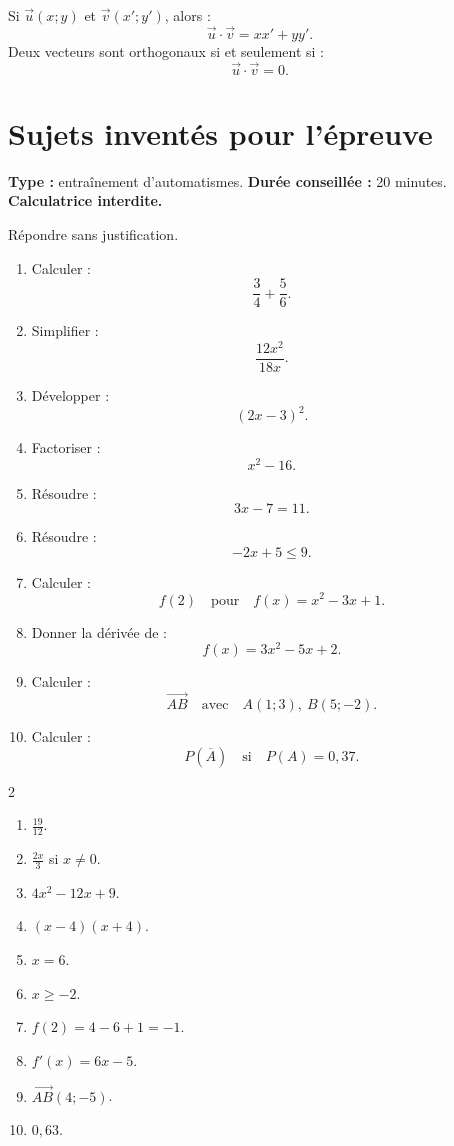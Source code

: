 \documentclass[11pt,a4paper]{article}
\begin{document}
\begin{methode}
Si $\vec u(x;y)$ et $\vec v(x';y')$, alors :
\[
\vec u\cdot \vec v=xx'+yy'.
\]
Deux vecteurs sont orthogonaux si et seulement si :
\[
\vec u\cdot \vec v=0.
\]
\end{methode}

\section{Sujets inventés pour l'épreuve}

\hypertarget{P-AUTO-01}{}
\begin{sujettype}
\textbf{Type :} entraînement d'automatismes.  
\textbf{Durée conseillée :} 20 minutes.  
\textbf{Calculatrice interdite.}

Répondre sans justification.

\begin{enumerate}
  \item Calculer :
  \[
  \frac{3}{4}+\frac{5}{6}.
  \]
  \item Simplifier :
  \[
  \frac{12x^2}{18x}.
  \]
  \item Développer :
  \[
  (2x-3)^2.
  \]
  \item Factoriser :
  \[
  x^2-16.
  \]
  \item Résoudre :
  \[
  3x-7=11.
  \]
  \item Résoudre :
  \[
  -2x+5\leq 9.
  \]
  \item Calculer :
  \[
  f(2)\quad\text{pour}\quad f(x)=x^2-3x+1.
  \]
  \item Donner la dérivée de :
  \[
  f(x)=3x^2-5x+2.
  \]
  \item Calculer :
  \[
  \overrightarrow{AB}
  \quad\text{avec}\quad
  A(1;3),\ B(5;-2).
  \]
  \item Calculer :
  \[
  P(\overline A)
  \quad\text{si}\quad
  P(A)=0{,}37.
  \]
\end{enumerate}
\end{sujettype}

\begin{corrige}[P-AUTO-01]
\begin{multicols}{2}
\begin{enumerate}
  \item $\frac{19}{12}$.
  \item $\frac{2x}{3}$ si $x\neq0$.
  \item $4x^2-12x+9$.
  \item $(x-4)(x+4)$.
  \item $x=6$.
  \item $x\geq -2$.
  \item $f(2)=4-6+1=-1$.
  \item $f'(x)=6x-5$.
  \item $\overrightarrow{AB}(4;-5)$.
  \item $0{,}63$.
\end{enumerate}
\end{multicols}
\end{corrige}
\end{document}
